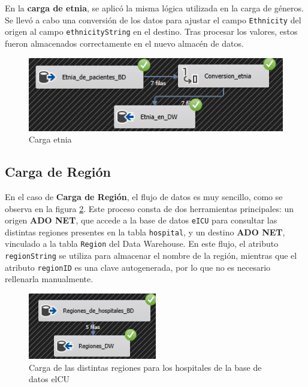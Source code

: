 \documentclass[12pt, a4paper, twoside]{article}
\begin{document}
	
	
	
	En la \textbf{carga de etnia}, se aplicó la misma lógica utilizada en la carga de géneros. Se llevó a cabo una conversión de los datos para ajustar el campo \texttt{Ethnicity} del origen al campo \texttt{ethnicityString} en el destino. Tras procesar los valores, estos fueron almacenados correctamente en el nuevo almacén de datos.
	
	
	\begin{figure}[H]
		\centering
		\includegraphics[width=1\textwidth]{image/107_carga_etnia.png}
		\caption{Carga etnia}
		\label{fig:11}
	\end{figure}
	
	
	\subsection{Carga de Región}
	
	En el caso de \textbf{Carga de Región}, el flujo de datos es muy sencillo, como se observa en la figura \ref{fig:4}. Este proceso consta de dos herramientas principales: un origen \textbf{ADO NET}, que accede a la base de datos \texttt{eICU} para consultar las distintas regiones presentes en la tabla \texttt{hospital}, y un destino \textbf{ADO NET}, vinculado a la tabla \texttt{Region} del Data Warehouse. En este flujo, el atributo \texttt{regionString} se utiliza para almacenar el nombre de la región, mientras que el atributo \texttt{regionID} es una clave autogenerada, por lo que no es necesario rellenarla manualmente.
	
	
	\begin{figure}[H]
		\centering
		\includegraphics[width=0.5\textwidth]{image/103_region.png}
		\caption{Carga de las distintas regiones para los hospitales de la base de datos elCU}
		\label{fig:4}
	\end{figure}
	
\end{document}
